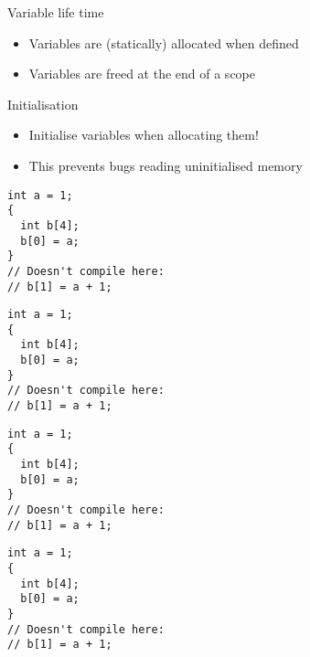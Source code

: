 \begin{frame}[fragile]
  \begin{block}{Variable life time}
    \begin{itemize}
      \item Variables are (statically) allocated when defined
      \item Variables are freed at the end of a scope
    \end{itemize}
  \end{block}
  \begin{goodpractice}{Initialisation}
    \begin{itemize}
      \item Initialise variables when allocating them!
      \item This prevents bugs reading uninitialised memory
    \end{itemize}
  \end{goodpractice}
  \begin{multicols}{2}
    \begin{overprint}[\columnwidth]
      \begin{verbatim}
int a = 1;
{
  int b[4];
  b[0] = a;
}
// Doesn't compile here:
// b[1] = a + 1;
      \end{verbatim}
      \begin{verbatim}
int a = 1;
{
  int b[4];
  b[0] = a;
}
// Doesn't compile here:
// b[1] = a + 1;
      \end{verbatim}
      \begin{verbatim}
int a = 1;
{
  int b[4];
  b[0] = a;
}
// Doesn't compile here:
// b[1] = a + 1;
      \end{verbatim}
      \begin{verbatim}
int a = 1;
{
  int b[4];
  b[0] = a;
}
// Doesn't compile here:
// b[1] = a + 1;
      \end{verbatim}
    \end{overprint}

    \columnbreak

\end{multicols}
\end{frame}
